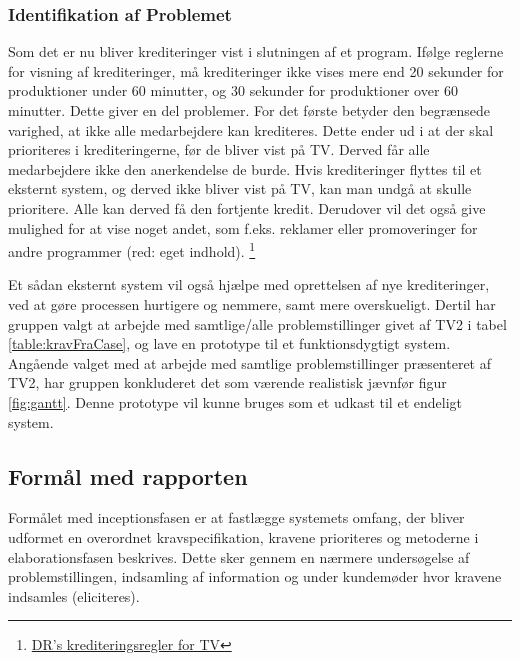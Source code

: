 \subsubsection{Identifikation af Problemet}
Som det er nu bliver krediteringer vist i slutningen af et program. Ifølge reglerne for visning af krediteringer, må krediteringer ikke vises mere end 20 sekunder for produktioner under 60 minutter, og 30 sekunder for produktioner over 60 minutter. Dette giver en del problemer. For det første betyder den begrænsede varighed, at ikke alle medarbejdere kan krediteres. Dette ender ud i at der skal prioriteres i krediteringerne, før de bliver vist på TV. Derved får alle medarbejdere ikke den anerkendelse de burde.
Hvis krediteringer flyttes til et eksternt system, og derved ikke bliver vist på TV, kan man undgå at skulle prioritere. Alle kan derved få den fortjente kredit. Derudover vil det også give mulighed for at vise noget andet, som f.eks. reklamer eller promoveringer for andre programmer (red: eget indhold).
\footnote{\href{https://www.dr.dk/NR/rdonlyres/00221a7b/dpikscstjptklixxdnjgywgeuakhwpog/DR_kreditmanual_050810.pdf}{DR’s krediteringsregler for TV}}

\noindent
Et sådan eksternt system vil også hjælpe med oprettelsen af nye krediteringer, ved at gøre processen hurtigere og nemmere, samt mere overskueligt. Dertil har gruppen valgt at arbejde med samtlige/alle problemstillinger givet af TV2 i tabel \ref{table:kravFraCase}, og lave en prototype til et funktionsdygtigt system. Angående valget med at arbejde med samtlige problemstillinger præsenteret af TV2, har gruppen konkluderet det som værende realistisk jævnfør figur \ref{fig:gantt}. Denne prototype vil kunne bruges som et udkast til et endeligt system.



\subsection{Formål med rapporten}
Formålet med inceptionsfasen er at fastlægge systemets omfang, der bliver udformet en overordnet kravspecifikation, kravene prioriteres og metoderne i elaborationsfasen beskrives. Dette sker gennem en nærmere undersøgelse af problemstillingen, indsamling af information og under kundemøder hvor kravene indsamles (eliciteres).\\

